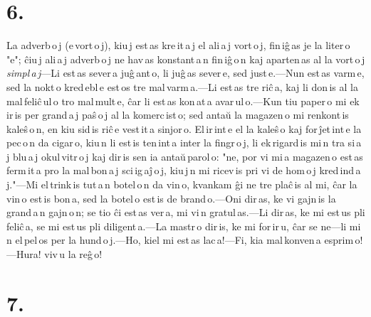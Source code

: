 \documentclass[ngerman,12pt,twoside]{book}
\begin{document}
\section*{6.}

La adverb\,o\,j (e\,vort\,o\,j), kiu\,j est\,as kre\,it\,a\,j el ali\,a\,j vort\,o\,j, fin\,iĝ\,as je la liter\,o "e"; ĉiu\,j ali\,a\,j adverb\,o\,j ne hav\,as konstant\,a\,n fin\,iĝ\,o\,n kaj aparten\,as al la vort\,o\,j \emph{simpl\,a\,j}---Li est\,as sever\,a juĝ\,ant\,o, li juĝ\,as sever\,e, sed just\,e.---Nun est\,as varm\,e, sed la nokt\,o kred\,ebl\,e est\,os tre mal\,varm\,a.---Li est\,as tre riĉ\,a, kaj li don\,is al la mal\,feliĉ\,ul\,o tro mal\,mult\,e, ĉar li est\,as kon\,at\,a avar\,ul\,o.---Kun tiu paper\,o mi ek\,ir\,is per grand\,a\,j paŝ\,o\,j al la komerc\,ist\,o; sed antaŭ la magazen\,o mi renkont\,is kaleŝ\,o\,n, en kiu sid\,is riĉ\,e vest\,it\,a sinjor\,o. El\,ir\,int\,e el la kaleŝ\,o kaj for\,ĵet\,int\,e la pec\,o\,n da cigar\,o, kiu\,n li est\,is ten\,int\,a inter la fingr\,o\,j, li ek\,rigard\,is mi\,n tra si\,a\,j blu\,a\,j okul\,vitr\,o\,j kaj dir\,is sen ia antaŭ\,parol\,o: "ne, por vi mi\,a magazen\,o est\,as ferm\,it\,a pro la mal\,bon\,a\,j sci\,ig\,aĵ\,o\,j, kiu\,j\,n mi ricev\,is pri vi de hom\,o\,j kred\,ind\,a\,j."---Mi el\,trink\,is tut\,a\,n botel\,o\,n da vin\,o, kvankam ĝi ne tre plaĉ\,is al mi, ĉar la vin\,o est\,is bon\,a, sed la botel\,o est\,is de brand\,o.---Oni dir\,as, ke vi gajn\,is la grand\,a\,n gajn\,o\,n; se tio ĉi est\,as ver\,a, mi vi\,n gratul\,as.---Li dir\,as, ke mi est\,us pli feliĉ\,a, se mi est\,us pli diligent\,a.---La mastr\,o dir\,is, ke mi for\,ir\,u, ĉar se ne---li mi\,n el\,pel\,os per la hund\,o\,j.---Ho, kiel mi est\,as lac\,a!---Fi, kia mal\,konven\,a esprim\,o!---Hura! viv\,u la reĝ\,o! 

\section*{7.}
\end{document}
